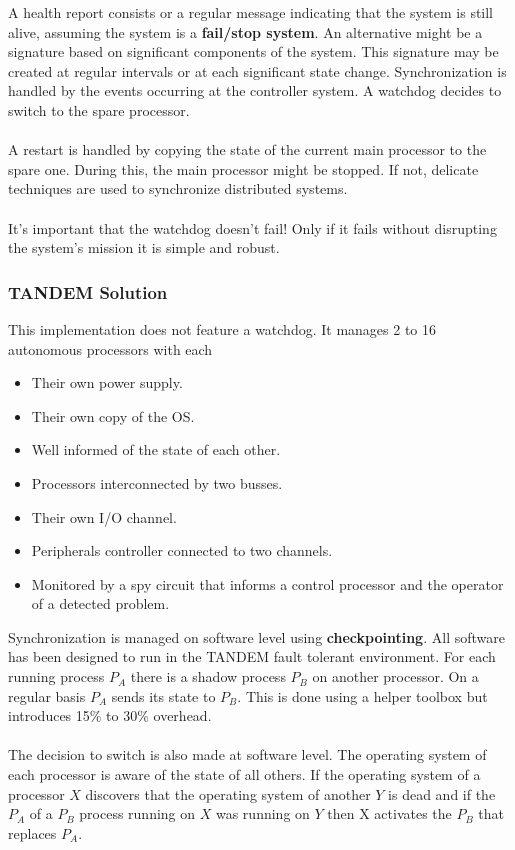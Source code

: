 \documentclass[../main.tex]{subfiles}
\begin{document}
A health report consists or a regular message indicating that the system is still alive, assuming the system is a \textbf{fail/stop system}.
An alternative might be a signature based on significant components of the system.
This signature may be created at regular intervals or at each significant state change.
Synchronization is handled by the events occurring at the controller system. A watchdog decides to switch to the spare processor. 
\\\\
A restart is handled by copying the state of the current main processor to the spare one. During this, the main processor might be stopped. If not, delicate techniques are used to synchronize distributed systems.
\\\\
It's important that the watchdog doesn't fail! Only if it fails without disrupting the system's mission it is simple and robust.


\subsubsection{TANDEM Solution}
This implementation does not feature a watchdog. It manages 2 to 16 autonomous processors with each 
\begin{multicols}{2}
\begin{itemize}
	\item Their own power supply.
	\item Their own copy of the OS.
	\item Well informed of the state of each other.
	\item Processors interconnected by two busses.
	\item Their own I/O channel.
	\item Peripherals controller connected to two channels.
	\item Monitored by a spy circuit that informs a control processor and the operator of a detected problem.
\end{itemize}
\end{multicols}

Synchronization is managed on software level using \textbf{checkpointing}. All software has been designed to run in the TANDEM fault tolerant environment. For each running process $P_A$ there is a shadow process $P_B$ on another processor. On a regular basis $P_A$ sends its state to $P_B$. This is done using a helper toolbox but introduces 15\% to 30\% overhead.
\\\\
The decision to switch is also made at software level. The operating system of each processor is aware of the state of all others. If the operating system of a processor $X$ discovers that the operating system of another $Y$ is dead and if the $P_A$ of a $P_B$ process running on $X$ was running on $Y$ then X activates the $P_B$ that replaces $P_A$. 
\end{document}
